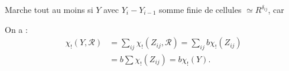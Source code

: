Marche tout au moins si $Y$   avec $Y_i-Y_{i-1}$ somme finie de cellules $\simeq R^{\delta_{ij}}$, car

On a :
\[
\begin{aligned}
\chi_!(Y,\mathcal{R})&=\sum_{ij}\chi_!(Z_{ij},\mathcal{R})=\sum_{ij}b\chi_!(Z_{ij})\\
&=b\sum\chi_!(Z_{ij})=b\chi_!(Y).
\end{aligned}
\]
\margin{(\unsure{ct.} sur $Z_{ij}$\unsure{)|]}}

